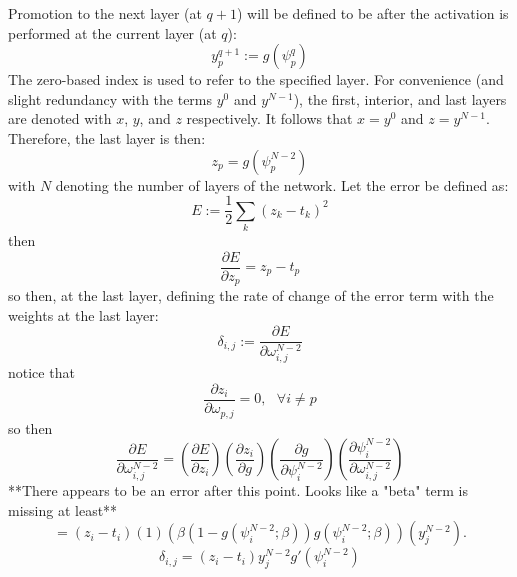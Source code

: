 \documentclass{article}
\begin{document}
Promotion to the next layer (at $q+1$) will be defined to be after the activation is performed at the current layer (at $q$):
%
\begin{equation} \label{eq:z}
y_p^{q+1} := g(\psi_p^q)
\end{equation}
%
The zero-based index is used to refer to the specified layer.
For convenience (and slight redundancy with the terms $y^0$ and $y^{N-1}$), the first, interior, and last layers are denoted with $x$, $y$, and $z$ respectively.
It follows that $x = y^0$ and $z = y^{N-1}$.
Therefore, the last layer is then:
%
\begin{equation} \label{eq:z}
z_p = g(\psi_p^{N-2})
\end{equation}
%
with $N$ denoting the number of layers of the network.
%
Let the error be defined as:
%
\begin{equation} \label{eq:error}
E := \frac{1}{2} \sum_k (z_k - t_k)^2
\end{equation}
%
then
%
\begin{equation} \label{eq:derror}
\frac{\partial E}{\partial z_p} = z_p - t_p
\end{equation}
%
so then, at the last layer, defining the rate of change of the error term with the weights at the last layer:
%
\begin{equation} \label{eq:delta}
\delta_{i,j} := \frac{\partial E}{\partial \omega_{i,j}^{N-2}}
\end{equation}
%
notice that
%
\begin{equation} \label{eq:last_layer_derror_eq_0}
\frac{\partial z_i}{\partial \omega_{p,j}} = 0, \ \ \ \forall i \neq p
\end{equation}
%
so then
%
\begin{equation} \label{eq:last_layer_derror}
\frac{\partial E}{\partial \omega_{i,j}^{N-2}} =
\left( \frac{\partial E}{\partial z_i} \right)
\left( \frac{\partial z_i}{\partial g} \right)
\left( \frac{\partial g}{\partial \psi_i^{N-2}} \right)
\left( \frac{\partial \psi_i^{N-2}}{\partial \omega_{i, j}^{N-2}} \right )
\end{equation}
%
**There appears to be an error after this point. Looks like a "beta" term is missing at least**
%
\begin{equation} \label{eq:last_layer_derror3}
=
\left( z_i - t_i \right)
\left( 1 \right)
\left( \beta (1 - g(\psi_i^{N-2}; \beta)) g(\psi_i^{N-2}; \beta) \right)
\left( y_j^{N-2} \right).
\end{equation}
%
\begin{equation} \label{eq:delta_full}
\delta_{i,j} = 
\left ( z_i - t_i \right ) y_j^{N-2} g' (\psi_i^{N-2})
\end{equation}
\end{document}
